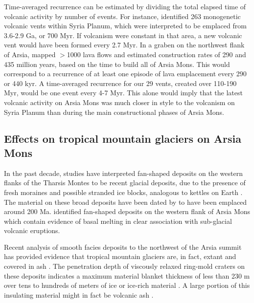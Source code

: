 Time-averaged recurrence can be estimated by dividing the total elapsed time of volcanic activity by number of events. For instance, \citet{richardson2013volcanic} identified 263 monogenetic volcanic vents within Syria Planum, which were interpreted to be emplaced from 3.6-2.9 Ga, or 700 Myr. If volcanism were constant in that area, a new volcanic vent would have been formed every 2.7 Myr. In a graben on the northwest flank of Arsia, \citet{mouginis2008lava} mapped $>$1000 lava flows and estimated construction rates of 290 and 435 million years, based on the time to build all of Arsia Mons. This would correspond to a recurrence of at least one episode of lava emplacement every 290 or 440 kyr. A time-averaged recurrence for our 29 vents, created over 110-190 Myr, would be one event every 4-7 Myr. This alone would imply that the latest volcanic activity on Arsia Mons was much closer in style to the volcanism on Syria Planum than during the main constructional phases of Arsia Mons.

\subsection{Effects on tropical mountain glaciers on Arsia Mons}

In the past decade, studies have interpreted fan-shaped deposits on the western flanks of the Tharsis Montes to be recent glacial deposits, due to the presence of fresh moraines and possible stranded ice blocks, analogous to kettles on Earth \citep{shean2007recent,kadish2014middle,scanlon2015remnant}. The material on these broad deposits have been dated by \citet{kadish2014middle} to have been emplaced around 200 Ma. \citet{scanlon2015volcanism} identified fan-shaped deposits on the western flank of Arsia Mons which contain evidence of basal melting in clear association with sub-glacial volcanic eruptions. 

Recent analysis of smooth facies deposits to the northwest of the Arsia summit has provided evidence that tropical mountain glaciers are, in fact, extant and covered in ash \citep{scanlon2015remnant}. The penetration depth of viscously relaxed ring-mold craters on these deposits indicates a maximum material blanket thickness of less than 230 m over tens to hundreds of meters of ice or ice-rich material \citep{head2014preservation}. A large portion of this insulating material might in fact be volcanic ash \citep{wilson1994mars,mouginis2002prodigious}.

